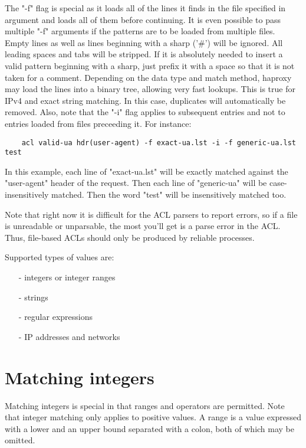 The "-f" flag is special as it loads all of the lines it finds in the file
specified in argument and loads all of them before continuing. It is even
possible to pass multiple "-f" arguments if the patterns are to be loaded from
multiple files. Empty lines as well as lines beginning with a sharp ('\#') will
be ignored. All leading spaces and tabs will be stripped. If it is absolutely
needed to insert a valid pattern beginning with a sharp, just prefix it with a
space so that it is not taken for a comment. Depending on the data type and
match method, haproxy may load the lines into a binary tree, allowing very fast
lookups. This is true for IPv4 and exact string matching. In this case,
duplicates will automatically be removed. Also, note that the "-i" flag applies
to subsequent entries and not to entries loaded from files preceeding it. For
instance:

\begin{verbatim}
    acl valid-ua hdr(user-agent) -f exact-ua.lst -i -f generic-ua.lst  test
\end{verbatim}

In this example, each line of "exact-ua.lst" will be exactly matched against
the "user-agent" header of the request. Then each line of "generic-ua" will be
case-insensitively matched. Then the word "test" will be insensitively matched
too.

Note that right now it is difficult for the ACL parsers to report errors, so if
a file is unreadable or unparsable, the most you'll get is a parse error in the
ACL. Thus, file-based ACLs should only be produced by reliable processes.

Supported types of values are:
\begin{itemize}
\item[-] integers or integer ranges
\item[-] strings
\item[-] regular expressions
\item[-] IP addresses and networks
\end{itemize}

\section{Matching integers}
\label{sec:matching_integers}

Matching integers is special in that ranges and operators are permitted. Note
that integer matching only applies to positive values. A range is a value
expressed with a lower and an upper bound separated with a colon, both of which
may be omitted.

